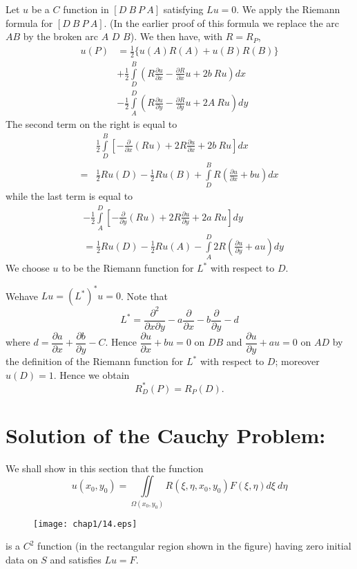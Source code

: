 Let $u$ be a $C$ function in $[D \ B \ P \ A]$ satisfying $Lu=0$. We apply the Riemann formula for $[D \ B \ P \ A]$. (In the earlier proof of this formula we replace the arc $AB$ by the broken arc $A$ $D$ $B$). We then have, with $R=R_{P}$,
\begin{align*}
u(P) &= \frac{1}{2}\{u(A)R(A)+u(B)R(B)\}\\[3pt]
&+\frac{1}{2}\int\limits^{B}_{D}\left(R\frac{\partial u}{\partial x}-\frac{\partial R}{\partial x}u+2b \ Ru\right)dx\\[4pt]
&-\frac{1}{2}\int\limits^{D}_{A}\left(R\frac{\partial u}{\partial y}-\frac{\partial R}{\partial y}u+2A \ Ru\right)dy
\end{align*}
The second term on the right is equal to
\begin{align*}
 &\frac{1}{2}\int\limits^{B}_{D}\left[-\frac{\partial}{\partial x}(Ru)+2R\frac{\partial u}{\partial x}+2b \ Ru\right]dx\\[3pt]
= & \frac{1}{2} Ru (D)-\frac{1}{2} Ru (B)+\int\limits^{B}_{D}R\left(\frac{\partial u}{\partial x}+bu\right)dx
\end{align*}
while the last term is equal to
\begin{align*}
& -\frac{1}{2}\int\limits^{D}_{A}\left[-\frac{\partial}{\partial y}(Ru)+2R\frac{\partial u}{\partial y}+2a \ Ru\right]dy\\[3pt]
&= \frac{1}{2} Ru (D)-\frac{1}{2} Ru (A) -\int\limits^{D}_{A}2R\left(\frac{\partial u}{\partial y}+au\right)dy
\end{align*}
We choose $u$ to be the Riemann function for $L^{*}$ with respect to $D$.

We\pageoriginale have $Lu=(L^{*})^{*}u=0$. Note that
$$
L^{*}=\dfrac{\partial^{2}}{\partial x\partial y}-a\frac{\partial}{\partial x}-b\frac{\partial}{\partial y}-d
$$
where $d=\dfrac{\partial a}{\partial x}+\dfrac{\partial b}{\partial y}-C$. Hence $\dfrac{\partial u}{\partial x}+bu=0$ on $DB$ and $\dfrac{\partial u}{\partial y}+au=0$ on $AD$ by the definition of the Riemann function for $L^{*}$ with respect to $D$; moreover $u(D)=1$. Hence we obtain
$$
R^{*}_{D}(P)=R_{P}(D).
$$

\section*{Solution of the Cauchy Problem:}

We shall show in this section that the function
$$
u(x_{0},y_{0})=\iint\limits_{\Omega(x_{0},y_{0})}R(\xi,\eta,x_{0},y_{0})F(\xi,\eta)d\xi \ d\eta
$$
\begin{figure}[H]
\centering
\texttt{[image: chap1/14.eps]}
\end{figure}
\noindent
is a $C^{2}$ function (in the rectangular region shown in the figure) having zero initial data on $S$ and satisfies $Lu=F$.

